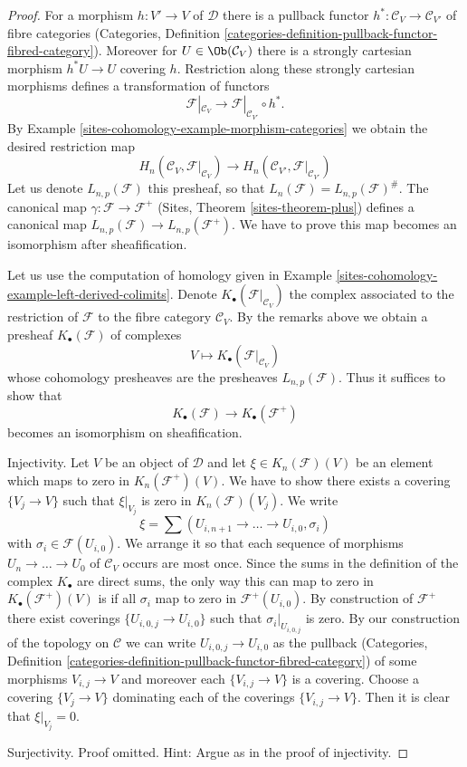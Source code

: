 \begin{proof}
For a morphism $h : V' \to V$ of $\mathcal{D}$ there is a
pullback functor $h^* : \mathcal{C}_V \to \mathcal{C}_{V'}$ of fibre
categories (Categories, Definition
\ref{categories-definition-pullback-functor-fibred-category}).
Moreover for $U \in \Ob(\mathcal{C}_V)$ there is a
strongly cartesian morphism $h^*U \to U$ covering $h$.
Restriction along these strongly cartesian morphisms defines a
transformation of functors
$$
\mathcal{F}|_{\mathcal{C}_V}
\longrightarrow
\mathcal{F}|_{\mathcal{C}_{V'}} \circ h^*.
$$
By Example \ref{sites-cohomology-example-morphism-categories}
we obtain the desired restriction map
$$
H_n(\mathcal{C}_V, \mathcal{F}|_{\mathcal{C}_V})
\longrightarrow
H_n(\mathcal{C}_{V'}, \mathcal{F}|_{\mathcal{C}_{V'}})
$$
Let us denote $L_{n, p}(\mathcal{F})$ this presheaf, so that
$L_n(\mathcal{F}) = L_{n, p}(\mathcal{F})^\#$.
The canonical map $\gamma : \mathcal{F} \to \mathcal{F}^+$
(Sites, Theorem \ref{sites-theorem-plus})
defines a canonical
map $L_{n, p}(\mathcal{F}) \to L_{n, p}(\mathcal{F}^+)$.
We have to prove this map becomes an isomorphism after sheafification.

\medskip\noindent
Let us use the computation of homology given in
Example \ref{sites-cohomology-example-left-derived-colimits}. Denote
$K_\bullet(\mathcal{F}|_{\mathcal{C}_V})$ the complex associated to
the restriction of $\mathcal{F}$ to the fibre category $\mathcal{C}_V$.
By the remarks above we obtain a presheaf $K_\bullet(\mathcal{F})$
of complexes
$$
V \longmapsto K_\bullet(\mathcal{F}|_{\mathcal{C}_V})
$$
whose cohomology presheaves are the presheaves $L_{n, p}(\mathcal{F})$.
Thus it suffices to show that
$$
K_\bullet(\mathcal{F}) \longrightarrow K_\bullet(\mathcal{F}^+)
$$
becomes an isomorphism on sheafification.

\medskip\noindent
Injectivity. Let $V$ be an object of $\mathcal{D}$ and let
$\xi \in K_n(\mathcal{F})(V)$ be an element which maps
to zero in $K_n(\mathcal{F}^+)(V)$. We have to show there exists a
covering $\{V_j \to V\}$ such that $\xi|_{V_j}$ is zero in
$K_n(\mathcal{F})(V_j)$. We write
$$
\xi = \sum (U_{i, n + 1} \to \ldots \to U_{i, 0}, \sigma_i)
$$
with $\sigma_i \in \mathcal{F}(U_{i, 0})$. We arrange it so that
each sequence of morphisms $U_n \to \ldots \to U_0$ of $\mathcal{C}_V$
occurs are most once. Since the sums in the definition
of the complex $K_\bullet$ are direct sums, the only way this can map
to zero in $K_\bullet(\mathcal{F}^+)(V)$ is if all $\sigma_i$ map
to zero in $\mathcal{F}^+(U_{i, 0})$. By construction of
$\mathcal{F}^+$ there exist coverings $\{U_{i, 0, j} \to U_{i, 0}\}$
such that $\sigma_i|_{U_{i, 0, j}}$ is zero. By our construction of
the topology on $\mathcal{C}$ we can write $U_{i, 0, j} \to U_{i, 0}$
as the pullback (Categories, Definition
\ref{categories-definition-pullback-functor-fibred-category})
of some morphisms $V_{i, j} \to V$ and moreover each
$\{V_{i, j} \to V\}$ is a covering. Choose a covering
$\{V_j \to V\}$ dominating each of the coverings $\{V_{i, j} \to V\}$.
Then it is clear that $\xi|_{V_j} = 0$.

\medskip\noindent
Surjectivity. Proof omitted. Hint: Argue as in the proof of
injectivity.
\end{proof}

